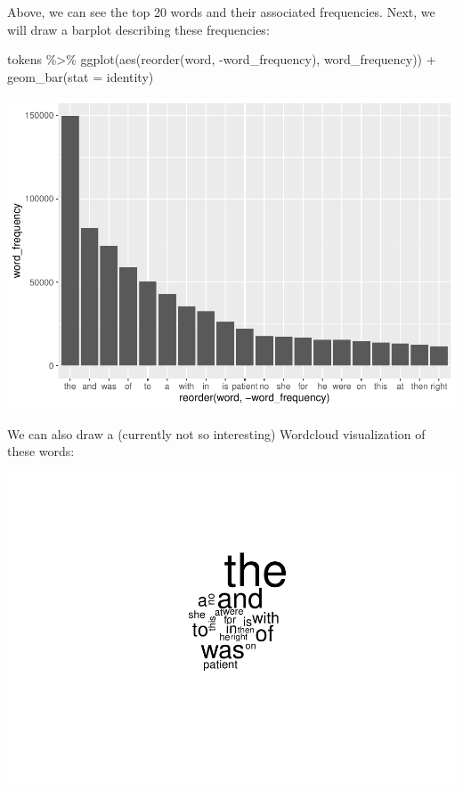 \documentclass[
]{article}
\newenvironment{Shaded}{\begin{snugshade}}{\end{snugshade}}
\newcommand{\AttributeTok}[1]{\textcolor[rgb]{0.77,0.63,0.00}{#1}}
\newcommand{\FunctionTok}[1]{\textcolor[rgb]{0.00,0.00,0.00}{#1}}
\newcommand{\NormalTok}[1]{#1}
\newcommand{\SpecialCharTok}[1]{\textcolor[rgb]{0.00,0.00,0.00}{#1}}
\newcommand{\StringTok}[1]{\textcolor[rgb]{0.31,0.60,0.02}{#1}}
\begin{document}
Above, we can see the top 20 words and their associated frequencies.
Next, we will draw a barplot describing these frequencies:

\begin{Shaded}
\begin{Highlighting}[]
\NormalTok{tokens }\SpecialCharTok{\%\textgreater{}\%}
  \FunctionTok{ggplot}\NormalTok{(}\FunctionTok{aes}\NormalTok{(}\FunctionTok{reorder}\NormalTok{(word, }\SpecialCharTok{{-}}\NormalTok{word\_frequency), word\_frequency)) }\SpecialCharTok{+}
  \FunctionTok{geom\_bar}\NormalTok{(}\AttributeTok{stat =} \StringTok{\textquotesingle{}identity\textquotesingle{}}\NormalTok{)}
\end{Highlighting}
\end{Shaded}

\includegraphics{lab08-text-mining_files/figure-latex/unnamed-chunk-5-1.pdf}

We can also draw a (currently not so interesting) Wordcloud
visualization of these words:

\begin{Shaded}
\end{Shaded}

\includegraphics{lab08-text-mining_files/figure-latex/unnamed-chunk-6-1.pdf}
\end{document}
